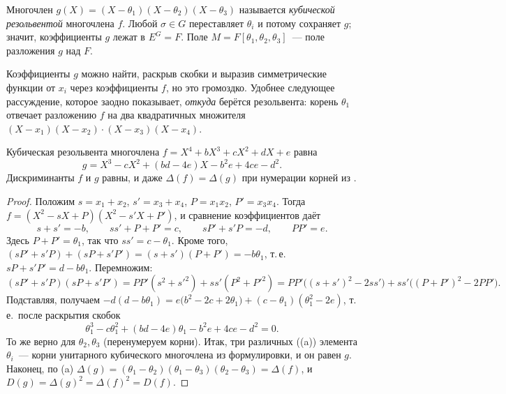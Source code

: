 \begin{definition}[4.8a]
Многочлен $g(X)=(X-\theta_1)(X-\theta_2)(X-\theta_3)$ называется \emph{кубической резольвентой} многочлена $f$. Любой $\sigma\in G$
переставляет $\theta_i$ и потому сохраняет $g$; значит, коэффициенты $g$ лежат в $E^G=F$. Поле $M=F[\theta_1,\theta_2,\theta_3]$~---
поле разложения $g$ над $F$.
\end{definition}

Коэффициенты $g$ можно найти, раскрыв скобки и выразив симметрические функции от $x_i$ через коэффициенты $f$, но это
громоздко. Удобнее следующее рассуждение, которое заодно показывает, \emph{откуда} берётся резольвента: корень $\theta_1$
отвечает разложению $f$ на два квадратичных множителя $(X-x_1)(X-x_2)\cdot(X-x_3)(X-x_4)$.

\begin{lemma}[4.9]
Кубическая резольвента многочлена $f=X^4+bX^3+cX^2+dX+e$ равна
\[
g=X^3-cX^2+(bd-4e)X-b^2e+4ce-d^2 .
\]
Дискриминанты $f$ и $g$ равны, и даже $\Delta(f)=\Delta(g)$ при нумерации корней из .
\end{lemma}

\begin{proof}
Положим $s=x_1+x_2$, $s'=x_3+x_4$, $P=x_1x_2$, $P'=x_3x_4$. Тогда $f=(X^2-sX+P)(X^2-s'X+P')$, и сравнение коэффициентов даёт
\[
s+s'=-b,\qquad ss'+P+P'=c,\qquad sP'+s'P=-d,\qquad PP'=e .
\]
Здесь $P+P'=\theta_1$, так что $ss'=c-\theta_1$. Кроме того, $(sP'+s'P)+(sP+s'P')=(s+s')(P+P')=-b\theta_1$, т.\,е.\ $sP+s'P'=d-b\theta_1$.
Перемножим:
\[
(sP'+s'P)(sP+s'P')=PP'(s^2+s'^2)+ss'(P^2+P'^2)=PP'\bigl((s+s')^2-2ss'\bigr)+ss'\bigl((P+P')^2-2PP'\bigr).
\]
Подставляя, получаем $-d(d-b\theta_1)=e\bigl(b^2-2c+2\theta_1\bigr)+(c-\theta_1)(\theta_1^2-2e)$, т.\,е.\ после раскрытия скобок
\[
\theta_1^3-c\theta_1^2+(bd-4e)\theta_1-b^2e+4ce-d^2=0 .
\]
То же верно для $\theta_2,\theta_3$ (перенумеруем корни). Итак, три различных ((a)) элемента $\theta_i$~--- корни унитарного
кубического многочлена из формулировки, и он равен $g$. Наконец, по (a)
$\Delta(g)=(\theta_1-\theta_2)(\theta_1-\theta_3)(\theta_2-\theta_3)=\Delta(f)$, и $D(g)=\Delta(g)^2=\Delta(f)^2=D(f)$.
\end{proof}

